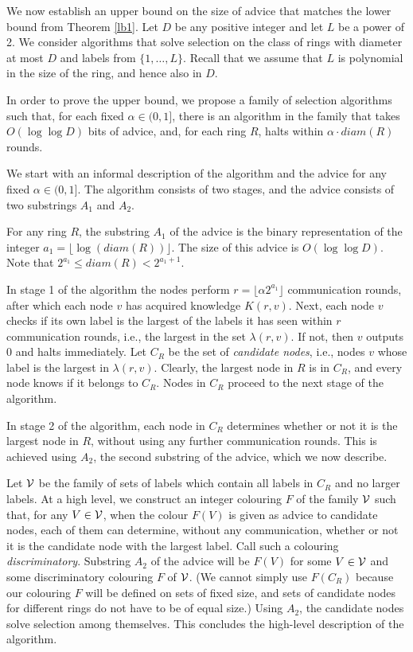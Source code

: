 \documentclass[11pt]{article}
\newcommand{\diam}[1]{\ensuremath{{diam}(#1)}}
\newcommand{\candidates}[1]{\ensuremath{C_{#1}}}
\begin{document}
We now establish an upper bound on the size of advice that matches the lower bound from Theorem \ref{lb1}.
Let $D$ be any positive integer and let $L$  be a power of 2.  We consider algorithms that solve selection on the class of rings with diameter at most $D$ and labels from $\{1,\ldots,L\}$. Recall that we assume that $L$ is polynomial in the size of the ring, and hence also in $D$.



In order to prove the upper bound, we propose a family of selection algorithms such that, for each fixed $\alpha \in (0,1]$, there is an algorithm in the family that takes $O(\log\log D)$ bits of advice, and, for each ring $R$, halts within $\alpha \cdot \diam{R}$ rounds. 

We start with an informal description of the algorithm and the advice for any fixed $\alpha \in (0,1]$. The algorithm consists of two stages, and the advice consists of two substrings $A_1$ and $A_2$.

For any ring $R$, the substring $A_1$ of the advice is the binary representation of the integer $a_1=\lfloor\log(\diam{R})\rfloor$. The size of this advice is $O(\log\log D)$. Note that $2^{a_1} \leq \diam{R} < 2^{a_1+1}$.

In stage 1 of the algorithm the nodes perform $r = \lfloor\alpha 2^{a_1}\rfloor$ communication rounds, after which each node $v$ has acquired knowledge $K(r,v)$. Next, each node $v$ checks if its own label is the largest of the labels it has seen within $r$ communication rounds, i.e., the largest in the set $\lambda(r,v)$. If not, then $v$ outputs 0 and halts immediately. 
Let $\candidates{R}$ be the set of {\em candidate nodes}, i.e., nodes $v$ whose label is the largest in $\lambda(r,v)$. Clearly, the largest node in $R$ is in $C_R$, and every node knows if it belongs to
 $\candidates{R}$. Nodes in $\candidates{R}$ proceed to the next stage of the algorithm. 

In stage 2 of the algorithm, each node in $\candidates{R}$ determines whether or not it is the largest node in $R$, without using any further communication rounds. This is achieved using $A_2$, the second substring of the advice, which we now describe.

Let $\cal V$ be the family of sets  of labels which contain all labels in $C_R$ and no larger labels.
At a high level, we construct an integer colouring $F$ of the family $\cal V$ such that, for any $V \in \cal V$,  
when the colour $F(V)$ is given as advice to candidate nodes, each of them can determine, without any communication, whether or not it is the candidate node with the largest label.
Call such a colouring {\em discriminatory}. 
Substring $A_2$ of the advice will be $F(V)$ for some $V \in \cal V$ and some discriminatory colouring $F$ of $\cal V$. (We cannot simply use $F(C_R)$ because our colouring $F$ will be defined on sets of fixed size, and sets of candidate nodes for different rings do not have to be of equal size.) 
Using $A_2$, the candidate nodes solve selection among themselves.
This concludes the high-level description of the algorithm.
\end{document}
